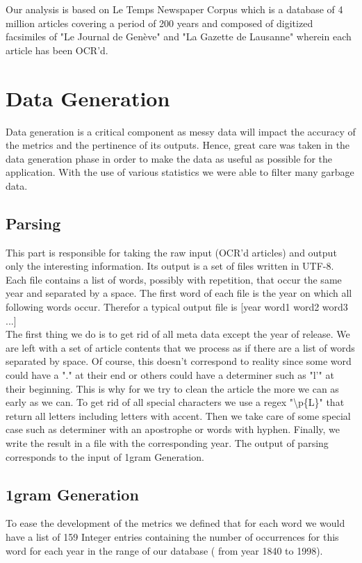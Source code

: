 \documentclass{article}
\begin{document}
Our analysis is based on Le Temps Newspaper Corpus which is a database of 4 million articles covering a period of 200 years and composed of digitized facsimiles of "Le Journal de Genève" and "La Gazette de Lausanne" wherein each article has been OCR'd.



\section{Data Generation}
Data generation is a critical component as messy data will impact the accuracy of the metrics and the pertinence of its outputs. Hence, great care was taken in the data generation phase in order to make the data as useful as possible for the application. With the use of various statistics we were able to filter many garbage data.

\subsection{Parsing}
This part is responsible for taking the raw input (OCR’d articles) and output only the interesting information. Its output is a set of files written in UTF-8. Each file contains a list of words, possibly with repetition, that occur the same year and separated by a space. The first word of each file is the year on which all following words occur. Therefor a typical output file is [year word1 word2 word3 ...]\\

The first thing we do is to get rid of all meta data except the year of release. We are left with a set of article contents that we process as if there are a list of words separated by space. Of course, this doesn't correspond to reality since some word could have a "." at their end or others could have a determiner such as "l'" at their beginning. This is why for we try to clean the article the more we can as early as we can. To get rid of all special characters we use a regex "\textbackslash p\{L\}" that return all letters including letters with accent. Then we take care of some special case such as determiner with an apostrophe or words with hyphen. Finally, we write the result in a file with the corresponding year. The output of parsing corresponds to the input of 1gram Generation.

\subsection{1gram Generation}
To ease the development of the metrics we defined that for each word we would have a list of 159 Integer entries containing the number of occurrences for this word for each year in the range of our database ( from year 1840 to 1998).\\
\end{document}
